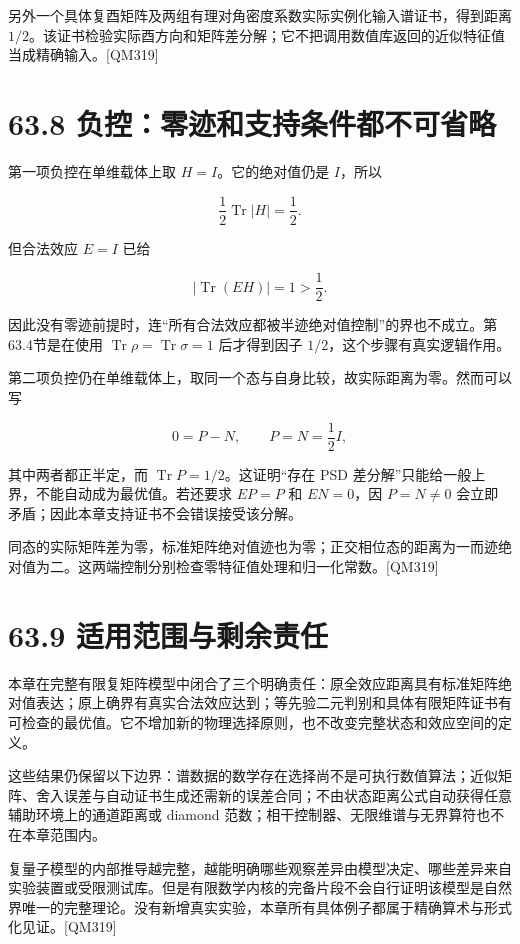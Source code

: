 \documentclass[
  11pt,
  oneside]{book}
\begin{document}
另外一个具体复酉矩阵及两组有理对角密度系数实际实例化输入谱证书，得到距离
\(1/2\)。该证书检验实际酉方向和矩阵差分解；它不把调用数值库返回的近似特征值当成精确输入。{[}QM319{]}

\section{63.8 负控：零迹和支持条件都不可省略}

第一项负控在单维载体上取 \(H=I\)。它的绝对值仍是 \(I\)，所以

\[
\frac12\operatorname{Tr}|H|=\frac12.
\]

但合法效应 \(E=I\) 已给

\[
|\operatorname{Tr}(EH)|=1>\frac12.
\]

因此没有零迹前提时，连``所有合法效应都被半迹绝对值控制''的界也不成立。第63.4节是在使用
\(\operatorname{Tr}\rho=\operatorname{Tr}\sigma=1\) 后才得到因子
\(1/2\)，这个步骤有真实逻辑作用。

第二项负控仍在单维载体上，取同一个态与自身比较，故实际距离为零。然而可以写

\[
0=P-N,\qquad P=N=\frac12I,
\]

其中两者都正半定，而 \(\operatorname{Tr}P=1/2\)。这证明``存在 PSD
差分解''只能给一般上界，不能自动成为最优值。若还要求 \(EP=P\) 和
\(EN=0\)，因 \(P=N\ne0\)
会立即矛盾；因此本章支持证书不会错误接受该分解。

同态的实际矩阵差为零，标准矩阵绝对值迹也为零；正交相位态的距离为一而迹绝对值为二。这两端控制分别检查零特征值处理和归一化常数。{[}QM319{]}

\section{63.9 适用范围与剩余责任}

本章在完整有限复矩阵模型中闭合了三个明确责任：原全效应距离具有标准矩阵绝对值表达；原上确界有真实合法效应达到；等先验二元判别和具体有限矩阵证书有可检查的最优值。它不增加新的物理选择原则，也不改变完整状态和效应空间的定义。

这些结果仍保留以下边界：谱数据的数学存在选择尚不是可执行数值算法；近似矩阵、舍入误差与自动证书生成还需新的误差合同；不由状态距离公式自动获得任意辅助环境上的通道距离或
diamond 范数；相干控制器、无限维谱与无界算符也不在本章范围内。

复量子模型的内部推导越完整，越能明确哪些观察差异由模型决定、哪些差异来自实验装置或受限测试库。但是有限数学内核的完备片段不会自行证明该模型是自然界唯一的完整理论。没有新增真实实验，本章所有具体例子都属于精确算术与形式化见证。{[}QM319{]}
\end{document}
